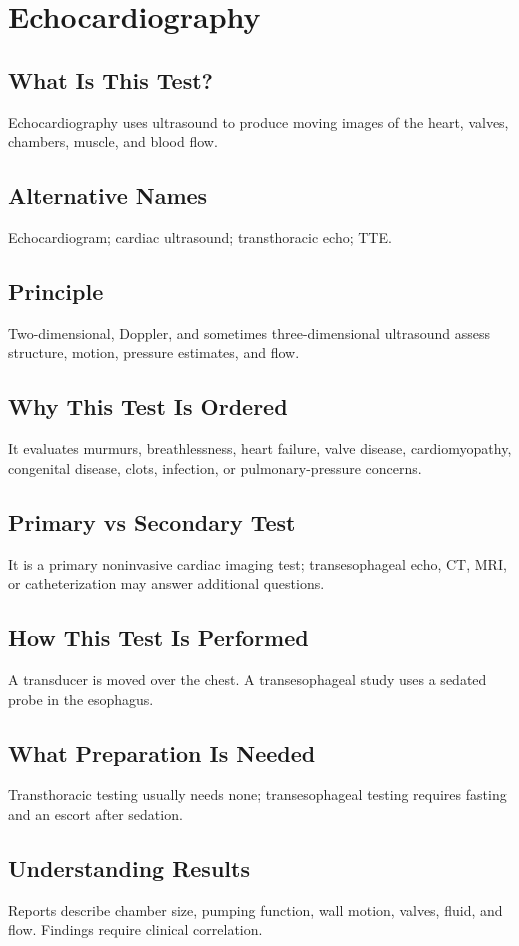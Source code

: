 \chapter{Echocardiography}
\section*{What Is This Test?} Echocardiography uses ultrasound to produce moving images of the heart, valves, chambers, muscle, and blood flow.
\section*{Alternative Names} Echocardiogram; cardiac ultrasound; transthoracic echo; TTE.
\section*{Principle} Two-dimensional, Doppler, and sometimes three-dimensional ultrasound assess structure, motion, pressure estimates, and flow.
\section*{Why This Test Is Ordered} It evaluates murmurs, breathlessness, heart failure, valve disease, cardiomyopathy, congenital disease, clots, infection, or pulmonary-pressure concerns.
\section*{Primary vs Secondary Test} It is a primary noninvasive cardiac imaging test; transesophageal echo, CT, MRI, or catheterization may answer additional questions.
\section*{How This Test Is Performed} A transducer is moved over the chest. A transesophageal study uses a sedated probe in the esophagus.
\section*{What Preparation Is Needed} Transthoracic testing usually needs none; transesophageal testing requires fasting and an escort after sedation.
\section*{Understanding Results} Reports describe chamber size, pumping function, wall motion, valves, fluid, and flow. Findings require clinical correlation.
